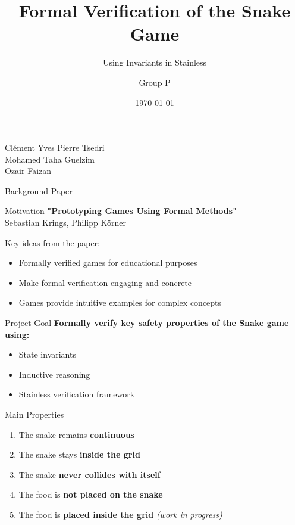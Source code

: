 \documentclass{beamer}
\title{Formal Verification of the Snake Game}
\subtitle{Using Invariants in Stainless}
\author{Group P}
\date{\today}
\begin{document}
\begin{frame}
  \titlepage
  \begin{center}
  \vspace{-1cm}
  \small
  Clément Yves Pierre Tsedri \\
  Mohamed Taha Guelzim \\
  Ozair Faizan
  \end{center}
\end{frame}


\begin{frame}{Background Paper}
\begin{block}{Motivation}
\textbf{"Prototyping Games Using Formal Methods"}\\
Sebastian Krings, Philipp Körner
\end{block}

\vspace{0.5cm}
Key ideas from the paper:
\begin{itemize}
  \item Formally verified games for educational purposes
  \item Make formal verification engaging and concrete
  \item Games provide intuitive examples for complex concepts
\end{itemize}
\end{frame}

\begin{frame}{Project Goal}
\textbf{Formally verify key safety properties of the Snake game using:}
\begin{itemize}
  \item State invariants
  \item Inductive reasoning
  \item Stainless verification framework
\end{itemize}

\vspace{0.5cm}
\begin{block}{Main Properties}
\begin{enumerate}
  \item The snake remains \textbf{continuous}
  \item The snake stays \textbf{inside the grid}
  \item The snake \textbf{never collides with itself}
  \item The food is \textbf{not placed on the snake}
  \item The food is \textbf{placed inside the grid} \emph{(work in progress)}
\end{enumerate}
\end{block}
\end{frame}
\end{document}
